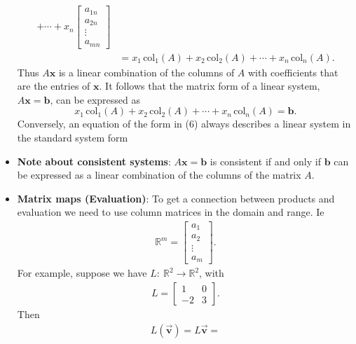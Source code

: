 \documentclass{report}
\begin{document}
\begin{itemize}
\begin{align*}
                            + \cdots + x_n
                            \begin{bmatrix} a_{1n} \\ a_{2n} \\ \vdots \\ a_{mn} \end{bmatrix} \\
                            &=
                            x_1 \, \text{col}_1(A) + x_2 \, \text{col}_2(A) + \cdots + x_n \, \text{col}_n(A).
            \end{align*}
            Thus $A\mathbf{x}$ is a linear combination of the columns of $A$ with coefficients that are the entries of $\mathbf{x}$. It follows that the matrix form of a linear system, $A\mathbf{x} = \mathbf{b}$, can be expressed as
            \[
                x_1 \, \text{col}_1(A) + x_2 \, \text{col}_2(A) + \cdots + x_n \, \text{col}_n(A) = \mathbf{b}. \tag{6}
            \]
            Conversely, an equation of the form in (6) always describes a linear system in the standard system form
        \item \textbf{Note about consistent systems}: $A\mathbf{x} = \mathbf{b}$ is consistent if and only if $\mathbf{b}$ can be expressed as a linear combination of the columns of the matrix $A$.
        \item \textbf{Matrix maps (Evaluation)}: To get a connection between products and evaluation we need to use column matrices in the domain and range. Ie 
            \begin{align*}
                \mathbb{R}^{m} =
                \begin{bmatrix}
                    a_{1} \\ a_{2} \\ \vdots \\ a_{m}
                \end{bmatrix}
            .\end{align*}
            \bigbreak \noindent 
            For example, suppose we have $L:\ \mathbb{R}^{2} \to\mathbb{R}^{2}$, with 
            \begin{align*}
                L = \begin{bmatrix}
                    1 & 0 \\
                    -2 & 3
                \end{bmatrix}
            .\end{align*}
            Then
            \begin{align*}
                L(\vec{\mathbf{v}}) = L\vec{\mathbf{v}}  = 

\end{align*}
\end{itemize}
\end{document}
